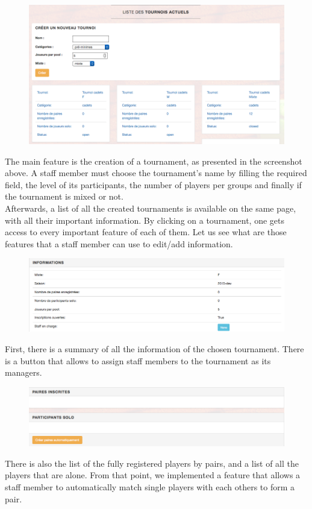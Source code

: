 \documentclass[a4paper, 12pt]{article}
\begin{document}
\begin{figure}[h]
\includegraphics[scale=0.5]{stafftournament.png}
\end{figure}
\FloatBarrier
The main feature is the creation of a tournament, as presented in the screenshot above. A staff member must choose the tournament's name by filling the required field, the level of its participants, the number of players per groups and finally if the tournament is mixed or not.\\

Afterwards, a list of all the created tournaments is available on the same page, with all their important information. By clicking on a tournament, one gets access to every important feature of each of them. Let us see what are those features that a staff member can use to edit/add information.\\

\begin{figure}[h]
\includegraphics[scale=0.5]{infotournament.png}
\end{figure}
\FloatBarrier
First, there is a summary of all the information of the chosen tournament. There is a button that allows to assign staff members to the tournament as its managers.\\

\begin{figure}[h]
\includegraphics[scale=0.5]{participtournament.png}
\end{figure}
\FloatBarrier
There is also the list of the fully registered players by pairs, and a list of all the players that are alone. From that point, we implemented a feature that allows a staff member to automatically match single players with each others to form a pair.\\
\end{document}
